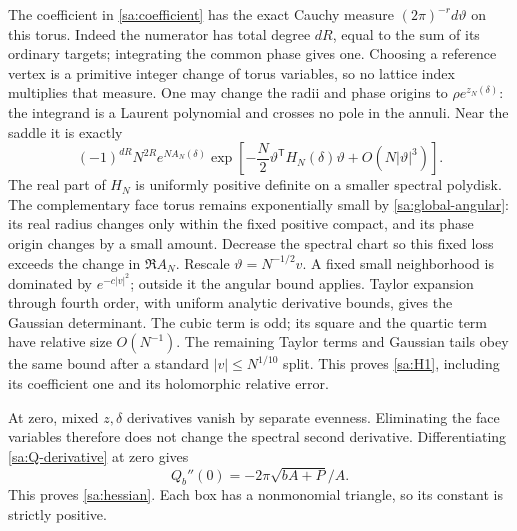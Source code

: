 The coefficient in \eqref{sa:coefficient} has the exact Cauchy measure
$(2\pi)^{-r}d\vartheta$ on this torus. Indeed the numerator has total
degree $dR$, equal to the sum of its ordinary targets; integrating
the common phase gives one. Choosing a reference vertex is a
primitive integer change of torus variables, so no lattice index
multiplies that measure.
One may change the radii and phase origins to $\rho e^{z_N(\delta)}$:
the integrand is a Laurent polynomial and crosses no pole in the
annuli. Near the saddle it is exactly
\[
 (-1)^{dR}N^{2R}e^{NA_N(\delta)}
 \exp\left[-\frac N2\vartheta^{\mathsf T}H_N(\delta)\vartheta
                                      +O(N|\vartheta|^3)\right].
\]
The real part of $H_N$ is uniformly positive definite on a smaller
spectral polydisk. The complementary face torus remains exponentially
small by \eqref{sa:global-angular}: its real radius changes only
within the fixed positive compact, and its phase origin changes by
a small amount. Decrease the spectral chart so this fixed loss exceeds
the change in $\Re A_N$.
Rescale $\vartheta=N^{-1/2}v$. A fixed small neighborhood is dominated
by $e^{-c|v|^2}$; outside it the angular bound applies. Taylor expansion
through fourth order, with uniform analytic derivative bounds, gives
the Gaussian determinant. The cubic term is odd; its square and the
quartic term have relative size $O(N^{-1})$. The remaining Taylor
terms and Gaussian tails obey the same bound after a standard
$|v|\le N^{1/10}$ split. This proves \eqref{sa:H1}, including its
coefficient one and its holomorphic relative error.

At zero, mixed $z,\delta$ derivatives vanish by separate evenness.
Eliminating the face variables therefore does not change the
spectral second derivative. Differentiating \eqref{sa:Q-derivative}
at zero gives
\[
 Q_b''(0)=-2\pi\sqrt{bA+P}/A.
\]
This proves \eqref{sa:hessian}. Each box has a nonmonomial triangle,
so its constant is strictly positive.

